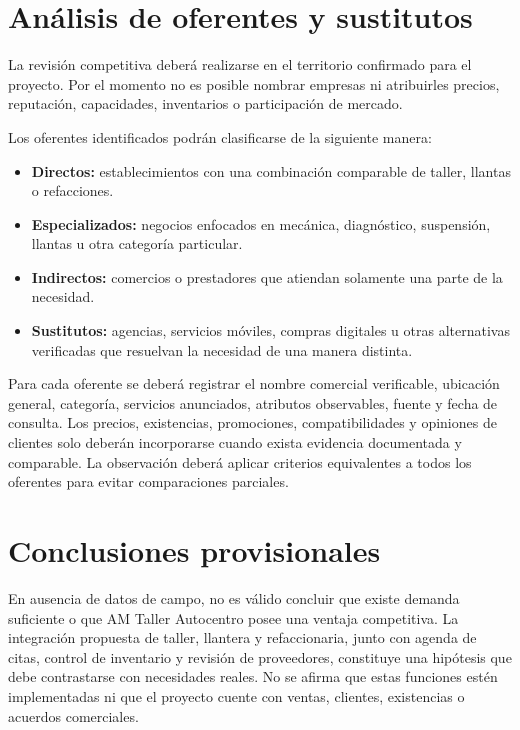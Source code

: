 \documentclass[12pt,letterpaper,oneside]{article}
\begin{document}
\section{Análisis de oferentes y sustitutos}

La revisión competitiva deberá realizarse en el territorio confirmado para el proyecto. Por el momento no es posible nombrar empresas ni atribuirles precios, reputación, capacidades, inventarios o participación de mercado.

Los oferentes identificados podrán clasificarse de la siguiente manera:

\begin{itemize}
    \item \textbf{Directos:} establecimientos con una combinación comparable de taller, llantas o refacciones.
    \item \textbf{Especializados:} negocios enfocados en mecánica, diagnóstico, suspensión, llantas u otra categoría particular.
    \item \textbf{Indirectos:} comercios o prestadores que atiendan solamente una parte de la necesidad.
    \item \textbf{Sustitutos:} agencias, servicios móviles, compras digitales u otras alternativas verificadas que resuelvan la necesidad de una manera distinta.
\end{itemize}

Para cada oferente se deberá registrar el nombre comercial verificable, ubicación general, categoría, servicios anunciados, atributos observables, fuente y fecha de consulta. Los precios, existencias, promociones, compatibilidades y opiniones de clientes solo deberán incorporarse cuando exista evidencia documentada y comparable. La observación deberá aplicar criterios equivalentes a todos los oferentes para evitar comparaciones parciales.

\section{Conclusiones provisionales}

En ausencia de datos de campo, no es válido concluir que existe demanda suficiente o que AM Taller Autocentro posee una ventaja competitiva. La integración propuesta de taller, llantera y refaccionaria, junto con agenda de citas, control de inventario y revisión de proveedores, constituye una hipótesis que debe contrastarse con necesidades reales. No se afirma que estas funciones estén implementadas ni que el proyecto cuente con ventas, clientes, existencias o acuerdos comerciales.
\end{document}
